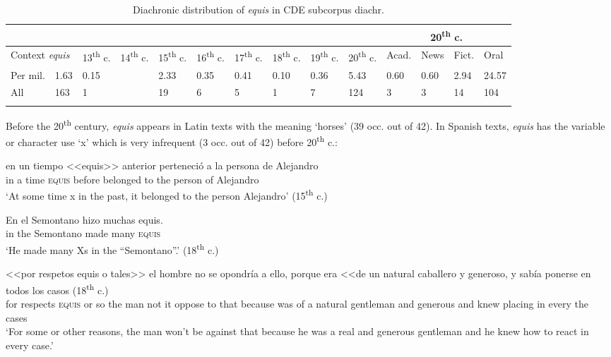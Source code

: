 \documentclass[output=paper
,modfonts
,nonflat]{langsci/langscibook}
\begin{document}
\begin{table}\small
\caption{Diachronic distribution of \textit{equis} in CDE subcorpus diachr.}
\label{tab:3:Equis MexSp. CDE}
 \begin{tabularx}{\textwidth}{XXXXXXXXXX|XXXX} 
  \lsptoprule
 & &  &  &  &  &  &  &  &  & \multicolumn{4}{c}{20\textsuperscript{th} c.\cellcolor[gray]{0.8}}\\
  \midrule
  \multicolumn{2}{p{1.5cm}}{Context \textit{equis}} & 13\textsuperscript{th} c. & 14\textsuperscript{th} c. & 15\textsuperscript{th} c. & 16\textsuperscript{th} c. & 17\textsuperscript{th} c. & 18\textsuperscript{th} c. & 19\textsuperscript{th} c. & 20\textsuperscript{th} c. & Acad. & News & Fict. & Oral\\
  \midrule
  Per mil.  & 1.63 & 0.15 &  & 2.33 & 0.35 & 0.41 & 0.10 & 0.36 & 5.43\cellcolor[gray]{0.8} & 0.60 & 0.60 & 2.94 & \footnotesize 24.57\cellcolor[gray]{0.6}\\
  \midrule
  All & 163 & 1 &  & 19 & 6 & 5 & 1 & 7 & 124\cellcolor[gray]{0.8} & 3 & 3 & 14 & 104\cellcolor[gray]{0.6}\\
  \lspbottomrule
 \end{tabularx}
\end{table}

Before the 20\textsuperscript{th} century, \textit{equis} appears in Latin texts with the meaning ‘horses’ (39 occ. out of 42). In Spanish texts, \textit{equis} has the variable or character use ‘x’ which is very infrequent (3 occ. out of 42) before 20\textsuperscript{th} c.:

\ea
\gll en un tiempo <<equis>> anterior perteneció a la persona de Alejandro\\
in a time \textsc{equis} before belonged to the person of Alejandro\\
\glt ‘At some time x in the past, it belonged to the person Alejandro’ (15\textsuperscript{th} c.)
\z

\ea
\gll En el Semontano hizo muchas equis.\\	
in the Semontano made many \textsc{equis}\\
\glt ‘He made many Xs in the “Semontano”.’ (18\textsuperscript{th} c.)
\z

\ea
\gll <<por respetos equis o tales>> el hombre no se	opondría a ello, porque era <<de un natural caballero y generoso, y sabía ponerse en todos los casos (18\textsuperscript{th} c.)\\
for respects \textsc{equis} or so the man not it oppose to that because was of a natural gentleman and generous and knew placing in every the cases\\
\glt ‘For some or other reasons, the man won’t be against that because he was a real and generous gentleman and he knew how to react in every case.’
\z
\end{document}
